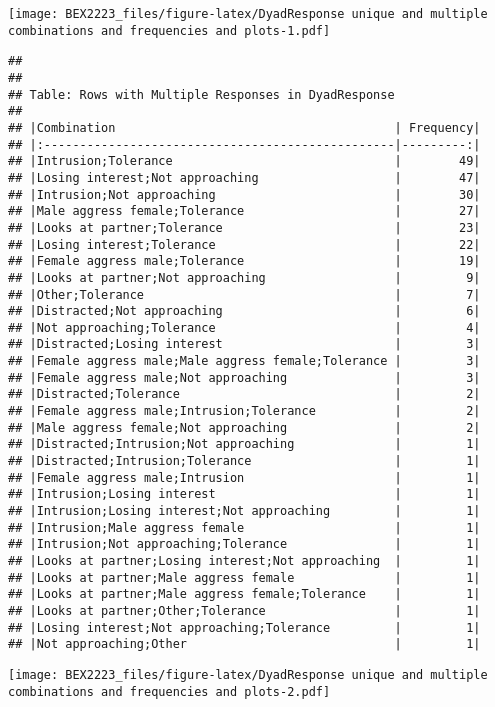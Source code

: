 \documentclass[
]{article}
\begin{document}
\texttt{[image: BEX2223\_files/figure-latex/DyadResponse unique and multiple combinations and frequencies and plots-1.pdf]}

\begin{verbatim}
## 
## 
## Table: Rows with Multiple Responses in DyadResponse
## 
## |Combination                                       | Frequency|
## |:-------------------------------------------------|---------:|
## |Intrusion;Tolerance                               |        49|
## |Losing interest;Not approaching                   |        47|
## |Intrusion;Not approaching                         |        30|
## |Male aggress female;Tolerance                     |        27|
## |Looks at partner;Tolerance                        |        23|
## |Losing interest;Tolerance                         |        22|
## |Female aggress male;Tolerance                     |        19|
## |Looks at partner;Not approaching                  |         9|
## |Other;Tolerance                                   |         7|
## |Distracted;Not approaching                        |         6|
## |Not approaching;Tolerance                         |         4|
## |Distracted;Losing interest                        |         3|
## |Female aggress male;Male aggress female;Tolerance |         3|
## |Female aggress male;Not approaching               |         3|
## |Distracted;Tolerance                              |         2|
## |Female aggress male;Intrusion;Tolerance           |         2|
## |Male aggress female;Not approaching               |         2|
## |Distracted;Intrusion;Not approaching              |         1|
## |Distracted;Intrusion;Tolerance                    |         1|
## |Female aggress male;Intrusion                     |         1|
## |Intrusion;Losing interest                         |         1|
## |Intrusion;Losing interest;Not approaching         |         1|
## |Intrusion;Male aggress female                     |         1|
## |Intrusion;Not approaching;Tolerance               |         1|
## |Looks at partner;Losing interest;Not approaching  |         1|
## |Looks at partner;Male aggress female              |         1|
## |Looks at partner;Male aggress female;Tolerance    |         1|
## |Looks at partner;Other;Tolerance                  |         1|
## |Losing interest;Not approaching;Tolerance         |         1|
## |Not approaching;Other                             |         1|
\end{verbatim}

\texttt{[image: BEX2223\_files/figure-latex/DyadResponse unique and multiple combinations and frequencies and plots-2.pdf]}
\end{document}
